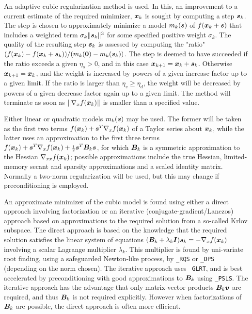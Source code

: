 \documentclass{galahad}
\begin{document}

\galmethod
An adaptive cubic regularization method is used.
In this, an improvement to a current
estimate of the required minimizer, ${\bm{x}}_k$ is sought by computing a
step ${\bm{s}}_k$. The step is chosen to approximately minimize a model $m_k({\bm{s}})$
of $f({\bm{x}}_k + {\bm{s}})$ that includes a weighted term $\sigma_k \|{\bm{s}}_k\|^3$
for some specified positive weight $\sigma_k$. The quality of the
resulting step ${\bm{s}}_k$ is assessed by computing the "ratio"
$(f({\bm{x}}_k) - f({\bm{x}}_k + {\bm{s}}_k))/ (m_k({\bm{0}}) - m_k({\bm{s}}_k))$.
The step is deemed to have succeeded if the ratio exceeds a given $\eta_s > 0$,
and in this case ${\bm{x}}_{k+1} = {\bm{x}}_k + {\bm{s}}_k$. Otherwise
${\bm{x}}_{k+1} = {\bm{x}}_k$, and the weight is increased by powers of a given
increase factor up to a given limit. If the ratio is larger than
$\eta_v \geq \eta_d$, the weight will be decreased by powers of a given
decrease factor again up to a given limit. The method will terminate
as soon as $\|\nabla_x f({\bm{x}}_k)\|$ is smaller than a specified value.

Either linear or quadratic models $m_k({\bm{s}})$ may be used. The former will be
taken as the first two terms $f({\bm{x}}_k) + {\bm{s}}^T \nabla_x f({\bm{x}}_k)$
of a Taylor series about ${\bm{x}}_k$, while the latter uses an
approximation to the first three terms
$f({\bm{x}}_k) + {\bm{s}}^T \nabla_x f({\bm{x}}_k) + {\scriptstyle \frac{1}{2}}
{\bm{s}}^T {\bm{B}}_k {\bm{s}}$,
for which ${\bm{B}}_k$ is a symmetric approximation to the Hessian
$\nabla_{xx} f({\bm{x}}_k)$; possible approximations include the true Hessian,
limited-memory secant and sparsity approximations and a scaled identity matrix.
Normally a two-norm regularization will be used, but this may change
if preconditioning is employed.

An approximate minimizer of the cubic model
is found using either a direct approach involving factorization or an
iterative (conjugate-gradient/Lanczos) approach based on approximations
to the required solution from a so-called Krlov subspace. The direct
approach is based on the knowledge that the required solution
satisfies the linear system of equations $({\bm{B}}_k + \lambda_k {\bm{I}}) {\bm{s}}_k
= - \nabla_x f({\bm{x}}_k)$ involving a scalar Lagrange multiplier $\lambda_k$.
This multiplier is found by uni-variate root finding, using a safeguarded
Newton-like process, by {\tt \libraryname\_RQS} or {\tt \libraryname\_DPS}
(depending on the norm chosen). The iterative approach
uses {\tt \libraryname\_GLRT}, and is best accelerated by preconditioning
with good approximations to ${\bm{B}}_k$ using {\tt \libraryname\_PSLS}. The
iterative approach has the advantage that only matrix-vector products
${\bm{B}}_k {\bm{v}}$ are required, and thus ${\bm{B}}_k$ is not required explicitly.
However when factorizations of ${\bm{B}}_k$ are possible, the direct approach
is often more efficient.
\vspace*{1mm}
\end{document}
